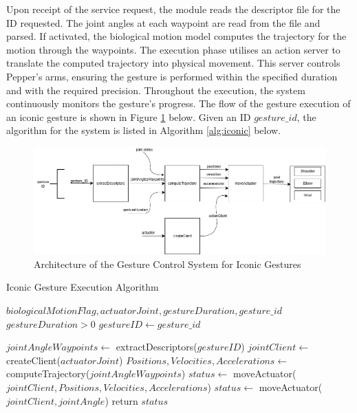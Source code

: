 \documentclass{CSSRforAfrica}
\begin{document}
Upon receipt of the service request, the module  reads the descriptor file for the ID requested. The joint angles at each waypoint are read from the file and parsed. If activated, the biological motion model computes the trajectory for the motion through the waypoints. The execution phase utilises an action server to translate the computed trajectory into physical movement. This server controls Pepper's arms, ensuring the gesture is performed within the specified duration and with the required precision. Throughout the execution, the system continuously monitors the gesture's progress.  The flow of the gesture execution of an iconic gesture is shown in Figure \ref{fig:iconicarchitecture} below. Given an ID $gesture\_id$, the algorithm for the system is listed in Algorithm \ref{alg:iconic} below.

\newpage
\begin{figure}[h!]
  \centering \includegraphics[scale=0.4]{Iconic Architecture.png}
  \caption{Architecture of the Gesture Control System for Iconic Gestures}
\label{fig:iconicarchitecture}
\end{figure}

\begin{algorithm}
	\caption{Iconic Gesture Execution Algorithm}\label{alg:iconic}
	\begin{algorithmic}
		\Require $biologicalMotionFlag,actuatorJoint, gestureDuration, gesture\_id$
		\Ensure $gestureDuration > 0$
		\State $gestureID \gets gesture\_id$
		
		\State $jointAngleWaypoints \gets $ extractDescriptors($gestureID$) 
		\State $jointClient \gets $ createClient($actuatorJoint$) 
			\State $Positions,Velocities, Accelerations \gets $ computeTrajectory($jointAngleWaypoints$)
			\State $status \gets $ moveActuator($jointClient,Positions,Velocities, Accelerations$)
		\Else
			\State $status \gets $ moveActuator($jointClient,jointAngle$) 
		\EndIf
		\State return $status$
	\end{algorithmic}
\end{algorithm}
\end{document}
